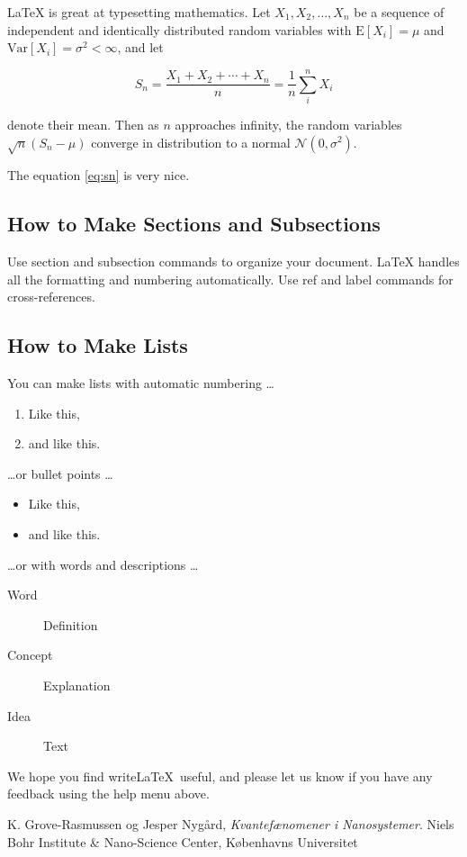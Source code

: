 \documentclass[a4paper]{article}
\begin{document}
\LaTeX{} is great at typesetting mathematics. Let $X_1, X_2, \ldots, X_n$ be a sequence of independent and identically distributed random variables with $\text{E}[X_i] = \mu$ and $\text{Var}[X_i] = \sigma^2 < \infty$, and let

\begin{equation}
S_n = \frac{X_1 + X_2 + \cdots + X_n}{n}
      = \frac{1}{n}\sum_{i}^{n} X_i
\label{eq:sn}
\end{equation}

denote their mean. Then as $n$ approaches infinity, the random variables $\sqrt{n}(S_n - \mu)$ converge in distribution to a normal $\mathcal{N}(0, \sigma^2)$.

The equation \ref{eq:sn} is very nice.

\subsection{How to Make Sections and Subsections}

Use section and subsection commands to organize your document. \LaTeX{} handles all the formatting and numbering automatically. Use ref and label commands for cross-references.

\subsection{How to Make Lists}

You can make lists with automatic numbering \dots

\begin{enumerate}
\item Like this,
\item and like this.
\end{enumerate}
\dots or bullet points \dots
\begin{itemize}
\item Like this,
\item and like this.
\end{itemize}
\dots or with words and descriptions \dots
\begin{description}
\item[Word] Definition
\item[Concept] Explanation
\item[Idea] Text
\end{description}

We hope you find write\LaTeX\ useful, and please let us know if you have any feedback using the help menu above.

\begin{thebibliography}{9}
  K. Grove-Rasmussen og Jesper Nygård,
  \emph{Kvantefænomener i Nanosystemer}.
  Niels Bohr Institute \& Nano-Science Center, Københavns Universitet

\end{thebibliography}
\end{document}
